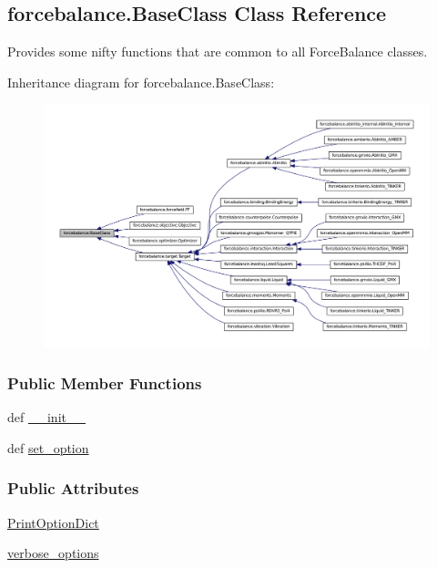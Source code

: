 \hypertarget{classforcebalance_1_1BaseClass}{\subsection{forcebalance.\-Base\-Class \-Class \-Reference}
\label{classforcebalance_1_1BaseClass}
}


\-Provides some nifty functions that are common to all \-Force\-Balance classes.  




\-Inheritance diagram for forcebalance.\-Base\-Class\-:
\nopagebreak
\begin{figure}[H]
\begin{center}
\leavevmode
\includegraphics[width=350pt]{classforcebalance_1_1BaseClass__inherit__graph}
\end{center}
\end{figure}
\subsubsection*{\-Public \-Member \-Functions}
\begin{DoxyCompactItemize}
\item 
def \hyperlink{classforcebalance_1_1BaseClass_ab395e00d6714b12c4b2d2ffeaa523772}{\-\_\-\-\_\-init\-\_\-\-\_\-}
\item 
def \hyperlink{classforcebalance_1_1BaseClass_a73e9a37a7632e79eb99f49bd15aced45}{set\-\_\-option}
\end{DoxyCompactItemize}
\subsubsection*{\-Public \-Attributes}
\begin{DoxyCompactItemize}
\item 
\hyperlink{classforcebalance_1_1BaseClass_afc6659278497d7245bc492ecf405ccae}{\-Print\-Option\-Dict}
\item 
\hyperlink{classforcebalance_1_1BaseClass_afd68efa29ccd2f320f4cf82198214aac}{verbose\-\_\-options}
\end{DoxyCompactItemize}


